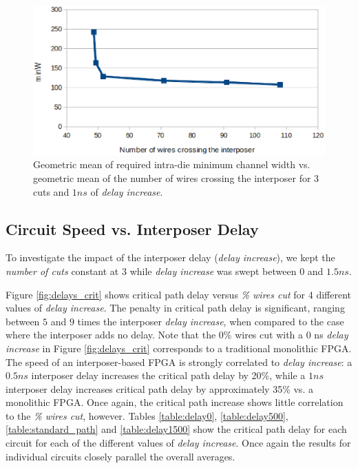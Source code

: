 \documentclass{sig-alternate-2013}
\begin{document}
\begin{figure}[!htbp]
\centering
\includegraphics[width=\linewidth]{numberofcrossingwires.eps}
\caption{Geometric mean of required intra-die minimum channel width vs. geometric mean of the number of wires crossing the interposer for 3 cuts and $1ns$ of \textit{delay increase}.}
\label{fig:crossingwires}
\end{figure}

\subsection{Circuit Speed vs. Interposer Delay}

To investigate the impact of the interposer delay (\textit{delay increase}), we kept the \textit{number of cuts} constant at $3$ while \textit{delay increase} was swept between $0$ and $1.5ns$.

Figure \ref{fig:delays_crit} shows critical path delay versus \textit{\% wires cut} for 4 different values of \textit{delay increase}. The penalty in critical path delay is significant, ranging between $5$ and $9$ times the interposer \textit{delay increase}, when compared to the case where the interposer adds no delay. Note that the 0\% wires cut with a 0 ns \textit{delay increase} in Figure \ref{fig:delays_crit} corresponds to a traditional monolithic FPGA. The speed of an interposer-based FPGA is strongly correlated to \textit{delay increase}: a $0.5ns$ interposer delay increases the critical path delay by 20\%, while a $1ns$ interposer delay increases critical path delay by approximately 35\% vs. a monolithic FPGA. Once again, the critical path increase shows little correlation to the \textit{\% wires cut}, however. Tables \ref{table:delay0}, \ref{table:delay500}, \ref{table:standard_path} and \ref{table:delay1500} show the critical path delay for each circuit for each of the different values of \textit{delay increase}. Once again the results for individual circuits closely parallel the overall averages.
\end{document}
